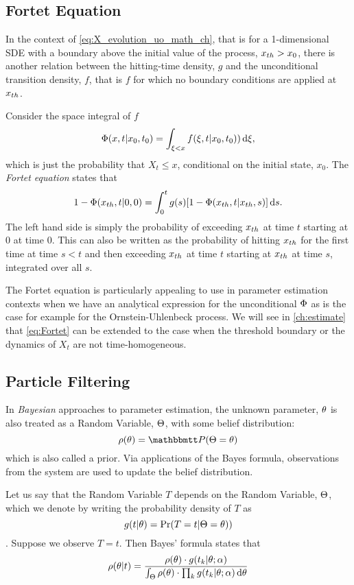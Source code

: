 \subsection{Fortet Equation} 
In the context of \cref{eq:X_evolution_uo_math_ch}, that is for a 1-dimensional
SDE with a boundary above the initial value of the process, ${ x_{th} }>x_0$, there is
another relation between the hitting-time density, $g$ and the unconditional transition density,
$f$, that is $f$ for which no boundary conditions are applied at ${ x_{th} }$.

Consider the space integral of $f$
$$ {\Phi}(x,t|x_0, t_0) = \int_{\xi<x} f( \xi, t |x_0, t_0)) \, \mathrm{d} \xi,$$
which is just the probability that $X_t \leq x$, conditional on the initial
state, $x_0$. The {\sl Fortet equation} \cite{Fortet1943} states that
\begin{equation}
1 - {\Phi}({ x_{th} }, t|0, 0) =
\int_0^t g(s) [1-{\Phi} ({ x_{th} },  t| { x_{th} }, s)] \, \mathrm{d} s.
\label{eq:Fortet}
\end{equation}
The left hand side is simply the probability of exceeding ${ x_{th} }$ at time
$t$ starting at $0$ at time $0$. This can also be written as the probability
of hitting ${ x_{th} }$ for the first time at time $s < t$ and then exceeding
${ x_{th} }$ at time $t$ starting at ${ x_{th} }$ at time $s$, integrated over all $s$.

The Fortet equation is particularly appealing to use in parameter estimation
contexts when we have an analytical expression for the unconditional ${\Phi}$ as is
the case for example for the Ornstein-Uhlenbeck process. We will see in
\cref{ch:estimate} that \cref{eq:Fortet} can be extended to the case when the
threshold boundary or the dynamics of $X_t$ are not time-homogeneous.

\subsection{Particle Filtering}
In {\sl Bayesian} approaches to parameter estimation, the unknown parameter,
${ \theta}$ is also treated as a Random Variable, ${\Theta}$, with some belief
distribution: $$ \rho(\th) = \Prob(\Theta = \th) $$ which is also called a
prior. Via applications of the Bayes formula, observations from the system are
used to update the belief distribution.

Let us say that the Random Variable $T$ depends on the Random Variable, ${\Theta}$,
which we denote by writing the probability density of $T$ as $$g(t|{ \theta}) =
\Pr(T=t|{\Theta}={ \theta}))$$. Suppose we observe $T=t$. Then Bayes' formula states that  $$
\rho({ \theta}|  t  ) = 
\frac{  \rho({ \theta}) \cdot g(t_k|{ \theta} ; \alpha) }
	 { \int_{\Theta}  \rho({ \theta}) \cdot \prod_k g(t_k|{ \theta} ; \alpha)  \, \mathrm{d} { \theta}}
$$

